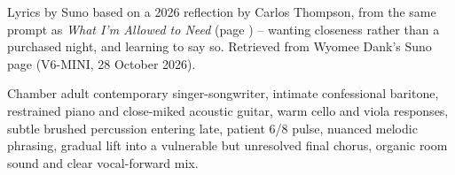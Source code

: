 
\label{sec:a-body-without-a-name}
\begin{notes}
Lyrics by Suno based on a 2026 reflection by Carlos Thompson, from the same prompt as \emph{What I'm Allowed to Need} (page \pageref{sec:what-im-allowed-to-need}) -- wanting closeness rather than a purchased night, and learning to say so. Retrieved from Wyomee Dank's Suno page (V6-MINI, 28 October 2026).
\end{notes}
\begin{style}
Chamber adult contemporary singer-songwriter, intimate confessional baritone, restrained piano and close-miked acoustic guitar, warm cello and viola responses, subtle brushed percussion entering late, patient 6/8 pulse, nuanced melodic phrasing, gradual lift into a vulnerable but unresolved final chorus, organic room sound and clear vocal-forward mix.
\end{style}
